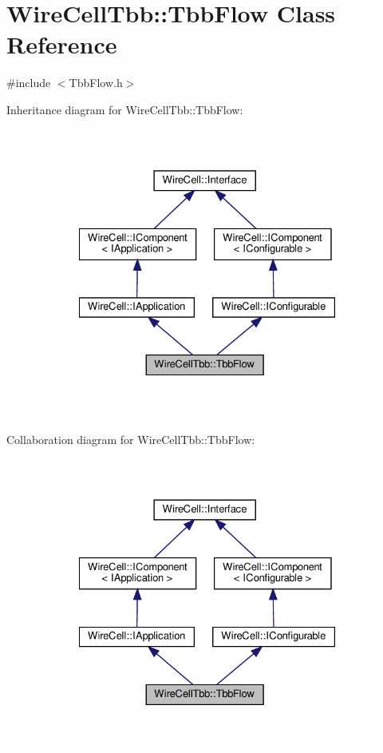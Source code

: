 \hypertarget{class_wire_cell_tbb_1_1_tbb_flow}{}\section{Wire\+Cell\+Tbb\+:\+:Tbb\+Flow Class Reference}
\label{class_wire_cell_tbb_1_1_tbb_flow}


{\ttfamily \#include $<$Tbb\+Flow.\+h$>$}



Inheritance diagram for Wire\+Cell\+Tbb\+:\+:Tbb\+Flow\+:
\nopagebreak
\begin{figure}[H]
\begin{center}
\leavevmode
\includegraphics[width=328pt]{class_wire_cell_tbb_1_1_tbb_flow__inherit__graph}
\end{center}
\end{figure}


Collaboration diagram for Wire\+Cell\+Tbb\+:\+:Tbb\+Flow\+:
\nopagebreak
\begin{figure}[H]
\begin{center}
\leavevmode
\includegraphics[width=328pt]{class_wire_cell_tbb_1_1_tbb_flow__coll__graph}
\end{center}
\end{figure}
